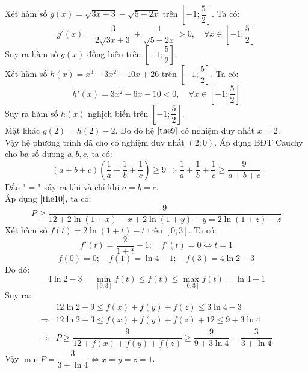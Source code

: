 Xét hàm số $g(x) = \sqrt{3x+3}-\sqrt{5-2x}$ trên $\left[ -1; \dfrac{5}{2}\right]$. Ta có:
$$g'(x) = \dfrac{3}{2\sqrt{3x+3}}+\dfrac{1}{\sqrt{5-2x}} > 0, \quad \forall x \in \left[ -1; \dfrac{5}{2}\right]$$
Suy ra hàm số $g(x)$ đồng biến trên $\left[ -1; \dfrac{5}{2}\right]$.\\
Xét hàm số $h(x) = x^3-3x^2-10x+26$ trên $\left[ -1; \dfrac{5}{2}\right]$. Ta có:
$$h'(x) = 3x^2-6x-10 < 0, \quad \forall x \in \left[ -1; \dfrac{5}{2}\right]$$
Suy ra hàm số $h(x)$ nghịch biến trên $\left[ -1; \dfrac{5}{2}\right]$.\\
Mặt khác $g(2)=h(2)-2$. Do đó hệ $\eqref{the9}$ có nghiệm duy nhất $x=2$.\\Vậy hệ phương trình đã cho có nghiệm duy nhất $(2;0)$.
\lgi
Áp dụng BĐT Cauchy cho ba số dương $a,b,c$, ta có:
\begin{equation} \label{the10}
(a+b+c)\left(\dfrac{1}{a}+\dfrac{1}{b}+\dfrac{1}{c}\right) \geq 9 \Rightarrow \dfrac{1}{a}+\dfrac{1}{b}+\dfrac{1}{c} \geq \dfrac{9}{a+b+c}
\end{equation}
Dấu "$=$" xảy ra khi và chỉ khi $a=b=c$.\\
Áp dụng $\eqref{the10}$, ta có:
$$P \geq \dfrac{9}{12+2\ln(1+x)-x+2\ln(1+y)-y=2\ln(1+z)-z}$$
Xét hàm số $f(t)=2\ln(1+t)-t$ trên $[0;3]$. Ta có:
$$f'(t) = \dfrac{2}{1+t}-1; \quad f'(t)=0 \Leftrightarrow t=1$$
$$f(0) = 0; \quad f(1)=\ln 4 -1; \quad f(3) = 4\ln 2 - 3$$
Do đó:
$$4\ln 2 - 3 = \min_{[0;3]}f(t) \leq f(t) \leq \max_{[0;3]}f(t) = \ln 4 - 1$$
Suy ra:
\begin{align*}
& 12\ln 2 - 9 \leq f(x) + f(y) + f(z) \leq 3 \ln 4 - 3 \\
\Rightarrow & 12\ln 2 + 3 \leq f(x) + f(y) + f(z) +12 \leq 9 + 3\ln 4 \\
\Rightarrow & P \geq \dfrac{9}{12+f(x)+f(y)+f(z)} \geq \dfrac{9}{9+3\ln 4} = \dfrac{3}{3+\ln 4}
\end{align*}
Vậy $\min P = \dfrac{3}{3+\ln 4} \Leftrightarrow x=y=z=1$.
